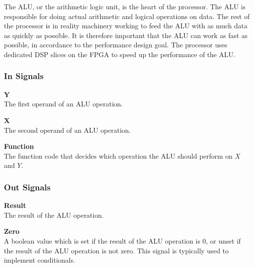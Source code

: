 The ALU, or the arithmetic logic unit, is the heart of the processor.
The ALU is responsible for doing actual arithmetic and logical operations on data.
The rest of the processor is in reality machinery working to feed the ALU with as much data as quickly as possible.
It is therefore important that the ALU can work as fast as possible, in accordance to the performance design goal\cn.
The processor uses dedicated DSP slices on the FPGA to speed up the performance of the ALU.

\subsubsection{In Signals}

\begin{description}
\item{\textbf{Y}} \\
The first operand of an ALU operation.

\item{\textbf{X}} \\
The second operand of an ALU operation.

\item{\textbf{Function}} \\
The function code that decides which operation the ALU should perform on $ X $ and $ Y $.
\end{description}

\subsubsection{Out Signals}

\begin{description}
\item{\textbf{Result}} \\
    The result of the ALU operation.

\item{\textbf{Zero}} \\
    A boolean value which is set if the result of the ALU operation is 0, or unset if the result of the ALU operation is not zero.
    This signal is typically used to implement conditionals.
\end{description}
